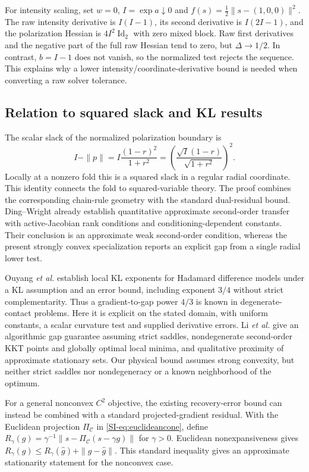 For intensity scaling, set $w=0$, $I=\exp a\downarrow0$ and $f(s)=\tfrac12\|s-(1,0,0)\|^2$. The raw intensity derivative is $I(I-1)$, its second derivative is $I(2I-1)$, and the polarization Hessian is $4I^2\operatorname{Id}_2$ with zero mixed block. Raw first derivatives and the negative part of the full raw Hessian tend to zero, but $\Delta\to1/2$. In contrast, $b=I-1$ does not vanish, so the normalized test rejects the sequence. This explains why a lower intensity/coordinate-derivative bound is needed when converting a raw solver tolerance.

\subsection{Relation to squared slack and KL results}
The scalar slack of the normalized polarization boundary is
\begin{equation}
 I-\|p\|=I\frac{(1-r)^2}{1+r^2}
       =\left(\frac{\sqrt I(1-r)}{\sqrt{1+r^2}}\right)^2.
 \label{SI-eq:sstopslacklink}
\end{equation}
Locally at a nonzero fold this is a squared slack in a regular radial coordinate. This identity connects the fold to squared-variable theory. The proof combines the corresponding chain-rule geometry with the standard dual-residual bound. Ding--Wright \cite[Thm.~3.6, Cor.~3.7]{supp-dingwright} already establish quantitative approximate second-order transfer with active-Jacobian rank conditions and conditioning-dependent constants. Their conclusion is an approximate weak second-order condition, whereas the present strongly convex specialization reports an explicit gap from a single radial lower test.

Ouyang \emph{et al.} \cite[Thm.~3.11, Rem.~3.12]{supp-ouyang} establish local KL exponents for Hadamard difference models under a KL assumption and an error bound, including exponent $3/4$ without strict complementarity. Thus a gradient-to-gap power $4/3$ is known in degenerate-contact problems. Here it is explicit on the stated domain, with uniform constants, a scalar curvature test and supplied derivative errors. Li \emph{et al.} \cite[Thm.~5, Lem.~6.1]{supp-hadamard} give an algorithmic gap guarantee assuming strict saddles, nondegenerate second-order KKT points and globally optimal local minima, and qualitative proximity of approximate stationary sets. Our physical bound assumes strong convexity, but neither strict saddles nor nondegeneracy or a known neighborhood of the optimum.

For a general nonconvex $C^2$ objective, the existing recovery-error bound can instead be combined with a standard projected-gradient residual. With the Euclidean projection $\Pi_{\mathcal C}$ in \eqref{SI-eq:euclideancone}, define $R_\gamma(g)=\gamma^{-1}\|s-\Pi_{\mathcal C}(s-\gamma g)\|$ for $\gamma>0$. Euclidean nonexpansiveness gives $R_\gamma(g)\le R_\gamma(\widehat g)+\|g-\widehat g\|$. This standard inequality gives an approximate stationarity statement for the nonconvex case.

